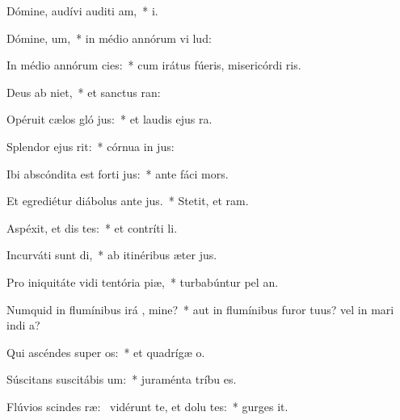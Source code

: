 \item Dómine, audívi auditi am,~*  i.
\item Dómine,  um,~* in médio annórum vi lud:
\item In médio annórum  cies:~* cum irátus fúeris, misericórdi ris.
\item Deus ab  niet,~* et sanctus   ran:
\item Opéruit cælos gló jus:~* et laudis ejus   ra.
\item Splendor ejus   rit:~* córnua in  jus:
\item Ibi abscóndita est forti jus:~* ante fáci   mors.
\item Et egrediétur diábolus ante  jus.~* Stetit, et   ram.
\item Aspéxit, et dis tes:~* et contríti   li.
\item Incurváti sunt  di,~* ab itinéribus æter jus.
\item Pro iniquitáte vidi tentória piæ,~* turbabúntur pel  an.
\item Numquid in flumínibus irá , mine?~* aut in flumínibus furor tuus? vel in mari indi a?
\item Qui ascéndes super  os:~* et quadrígæ  o.
\item Súscitans suscitábis  um:~* juraménta tríbu   es.
\item Flúvios scindes ræ:~\pscross{} vidérunt te, et dolu tes:~* gurges  it.
